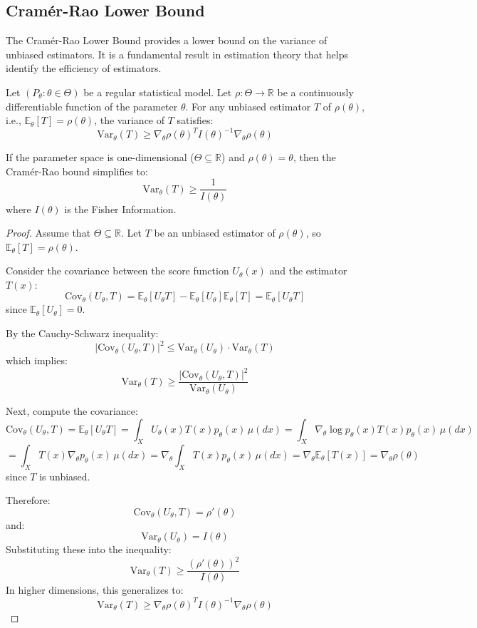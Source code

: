 \documentclass[open=any, 11pt,paper=A4]{scrreprt}
\begin{document}
\subsection{Cramér-Rao Lower Bound}

The Cramér-Rao Lower Bound provides a lower bound on the variance of unbiased estimators. It is a fundamental result in estimation theory that helps identify the efficiency of estimators.

\begin{theorem}
Let $(P_\theta : \theta \in \Theta)$ be a regular statistical model. Let $\rho: \Theta \to \mathbb{R}$ be a continuously differentiable function of the parameter $\theta$. For any unbiased estimator $T$ of $\rho(\theta)$, i.e., $\mathbb{E}_\theta[T] = \rho(\theta)$, the variance of $T$ satisfies:
\[
\text{Var}_\theta(T) \geq \nabla_\theta \rho(\theta)^T I(\theta)^{-1} \nabla_\theta \rho(\theta)
\]
\end{theorem}

\begin{remark}
If the parameter space is one-dimensional ($\Theta \subseteq \mathbb{R}$) and $\rho(\theta) = \theta$, then the Cramér-Rao bound simplifies to:
\[
\text{Var}_\theta(T) \geq \frac{1}{I(\theta)}
\]
where $I(\theta)$ is the Fisher Information.
\end{remark}

\begin{proof}
Assume that $\Theta \subseteq \mathbb{R}$. Let $T$ be an unbiased estimator of $\rho(\theta)$, so $\mathbb{E}_\theta[T] = \rho(\theta)$. 

Consider the covariance between the score function $U_\theta(x)$ and the estimator $T(x)$:
\[
\text{Cov}_\theta(U_\theta, T) = \mathbb{E}_\theta[U_\theta T] - \mathbb{E}_\theta[U_\theta] \mathbb{E}_\theta[T] = \mathbb{E}_\theta[U_\theta T]
\]
since $\mathbb{E}_\theta[U_\theta] = 0$.

By the Cauchy-Schwarz inequality:
\[
|\text{Cov}_\theta(U_\theta, T)|^2 \leq \text{Var}_\theta(U_\theta) \cdot \text{Var}_\theta(T)
\]
which implies:
\[
\text{Var}_\theta(T) \geq \frac{|\text{Cov}_\theta(U_\theta, T)|^2}{\text{Var}_\theta(U_\theta)}
\]

Next, compute the covariance:
\[
\text{Cov}_\theta(U_\theta, T) = \mathbb{E}_\theta[U_\theta T] = \int_X U_\theta(x) T(x) p_\theta(x) \, \mu(dx) = \int_X \nabla_\theta \log p_\theta(x) T(x) p_\theta(x) \, \mu(dx)
\]
\[
= \int_X T(x) \nabla_\theta p_\theta(x) \, \mu(dx) = \nabla_\theta \int_X T(x) p_\theta(x) \, \mu(dx) = \nabla_\theta \mathbb{E}_\theta[T(x)] = \nabla_\theta \rho(\theta)
\]
since $T$ is unbiased.

Therefore:
\[
\text{Cov}_\theta(U_\theta, T) = \rho'(\theta)
\]
and:
\[
\text{Var}_\theta(U_\theta) = I(\theta)
\]
Substituting these into the inequality:
\[
\text{Var}_\theta(T) \geq \frac{(\rho'(\theta))^2}{I(\theta)}
\]
In higher dimensions, this generalizes to:
\[
\text{Var}_\theta(T) \geq \nabla_\theta \rho(\theta)^T I(\theta)^{-1} \nabla_\theta \rho(\theta)
\]
\end{proof}
\end{document}
